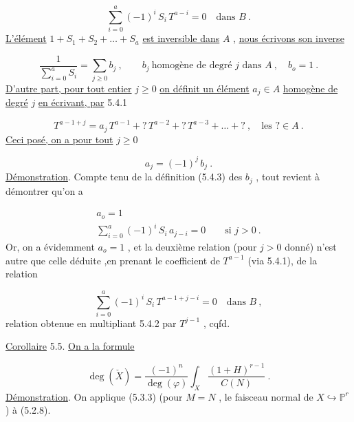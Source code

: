 \begin{equation}\tag{5.4.2}
\sum_{i=0}^{a} (-1)^i \, S_i \, T^{a-i} = 0 \quad \mbox{dans } B \ .
\end{equation}
\underline{L'élément} $1 + S_1 + S_2 + \ldots + S_a$ \underline{est inversible dans} $A$ , \underline{nous écrivons son inverse}

\begin{equation}\tag{5.4.3}
\frac{1}{\sum\limits_{i=0}^{a} S_i} = \sum_{j \geq 0} b_j \ , \qquad b_j \ \mbox{homogène de degré } j \mbox{ dans } A \ , \quad b_o = 1 \ .
\end{equation}
\underline{D'autre part, pour tout entier} $j \geq 0$ \underline{on définit un élément} $a_j \in A$ \underline{homogène de degré} $j$ \underline{en écrivant, par} 5.4.1

\begin{equation}\tag{5.4.4}
T^{a-1+j} = a_j \, T^{a-1} + ? \, T^{a-2} + ? \, T^{a-3} + \ldots + ? \ , \quad \mbox{les } ? \in A \ .
\end{equation}
\underline{Ceci posé, on a pour tout} $j \geq 0$

\begin{equation}\tag{5.4.5}
a_j = (-1)^j \, b_j \ .
\end{equation}
\underline{Démonstration}. Compte tenu de la définition (5.4.3) des $b_j$ , tout revient à démontrer qu'on a 



\begin{equation}\tag{5.4.6}
 \begin{array}{l} a_o = 1 \\[4pt] \sum\limits_{i=0}^{a} (-1)^i \, S_i \, a_{j-i} = 0 \qquad \mbox{si } j > 0 \ . \end{array}
\end{equation}
Or, on a évidemment $a_o = 1$ , et la deuxième relation (pour $j > 0$ donné) n'est autre que celle déduite ,en prenant le coefficient de $T^{a-1}$ (via 5.4.1), de la relation

\begin{equation}\tag{5.4.7}
\sum_{i=0}^{a} (-1)^i \, S_i \, T^{a-1+j-i} = 0 \quad \mbox{dans } B \ ,
\end{equation}
relation obtenue en multipliant 5.4.2 par $T^{j-1}$ , cqfd.

\underline{Corollaire} 5.5. \underline{On a la formule}

\begin{equation}\tag{5.5.1}
\deg(\check{X}) = \frac{(-1)^n}{\deg(\varphi)} \int_X \frac{(1+H)^{r-1}}{C(N)} \ .
\end{equation}
\underline{Démonstration}. On applique (5.3.3) (pour $M = N$ , le faisceau normal de $X \hookrightarrow \mathbb{P}^r$) à (5.2.8).

